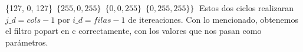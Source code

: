     \hspace*{2.8cm}  \{127,   0, 127\}\,\newline
    \hspace*{2.8cm}               $\{255,   0, 255\}\,$\newline
     \hspace*{2.8cm}              $\{  0,   0, 255\}\,$\newline
	\hspace*{2.8cm}	     $\{  0, 255, 255\} \}\;$
\vspace*{0.3cm} \noindent\newline
Estos dos ciclos realizaran $j\_d = cols - 1$  por $i\_d = filas -1$ de itereaciones.\newline
Con lo mencionado, obtenemos el filtro popart en c correctamente, con los valores que nos pasan como parámetros.\newline

\vspace*{0.3cm} \noindent
